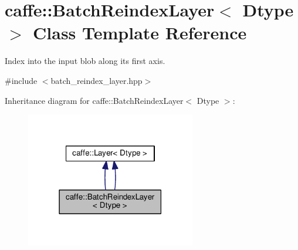 \hypertarget{classcaffe_1_1_batch_reindex_layer}{}\section{caffe\+:\+:Batch\+Reindex\+Layer$<$ Dtype $>$ Class Template Reference}
\label{classcaffe_1_1_batch_reindex_layer}


Index into the input blob along its first axis.  




{\ttfamily \#include $<$batch\+\_\+reindex\+\_\+layer.\+hpp$>$}



Inheritance diagram for caffe\+:\+:Batch\+Reindex\+Layer$<$ Dtype $>$\+:
\nopagebreak
\begin{figure}[H]
\begin{center}
\leavevmode
\includegraphics[width=210pt]{classcaffe_1_1_batch_reindex_layer__inherit__graph}
\end{center}
\end{figure}
